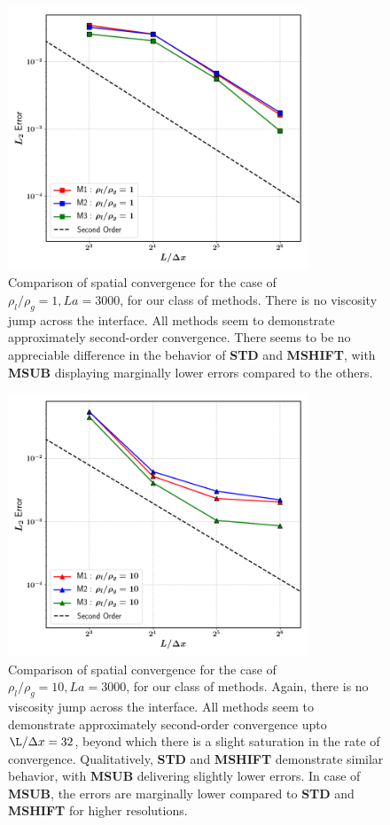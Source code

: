 \begin{figure}[h!]
    \centering
    \includegraphics[width = 0.8\textwidth]{plots/capwave/conv_r1.png}
	\caption{Comparison of spatial convergence for the case of $\rho_l/\rho_g = 1 , La = 3000$, for our class of methods. There is no viscosity jump across the interface. All methods seem to demonstrate approximately second-order convergence. There seems to be no appreciable difference in the behavior of \textbf{STD} and \textbf{MSHIFT}, with \textbf{MSUB} displaying marginally lower errors compared to the others. }
    \label{conv_r1}
\end{figure}


\begin{figure}[h!]
    \centering
    \includegraphics[width = 0.8\textwidth]{plots/capwave/conv_r10.png}
	\caption{Comparison of spatial convergence for the case of $\rho_l/\rho_g = 10 , La = 3000$, for our class of methods. Again, there is no viscosity jump across the interface. All methods seem to demonstrate approximately second-order convergence upto $\L/ \Delta x = 32 $, beyond which there is a slight saturation in the rate of convergence. Qualitatively, \textbf{STD} and \textbf{MSHIFT} demonstrate similar behavior, with \textbf{MSUB} delivering slightly lower errors. In case of \textbf{MSUB}, the errors are marginally lower compared to \textbf{STD} and \textbf{MSHIFT} for higher resolutions. }
    \label{conv_r10}
\end{figure}


